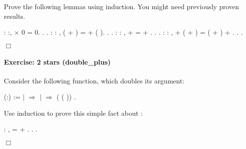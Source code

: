 \documentclass[12pt]{report}
\begin{document}
 Prove the following lemmas using induction. You might need
    previously proven results. \begin{coqdoccode}
\coqdocemptyline
\coqdocnoindent
{}  : \coqdockw{\ensuremath{\forall}} :,\coqdoceol
\coqdocindent{1.00em}
 \ensuremath{\times} 0 = 0.\coqdoceol
\coqdocnoindent
{}.\coqdoceol
 .\coqdoceol
\coqdocemptyline
\coqdocnoindent
{}  : \coqdockw{\ensuremath{\forall}}   : , \coqdoceol
\coqdocindent{1.00em}
 ( + ) =  + ( ).\coqdoceol
\coqdocnoindent
{}.\coqdoceol
 .\coqdoceol
\coqdocemptyline
\coqdocnoindent
{}  : \coqdockw{\ensuremath{\forall}}   : ,\coqdoceol
\coqdocindent{1.00em}
 +  =  + .\coqdoceol
\coqdocnoindent
{}.\coqdoceol
 .\coqdoceol
\coqdocemptyline
\coqdocnoindent
{}  : \coqdockw{\ensuremath{\forall}}    : ,\coqdoceol
\coqdocindent{1.00em}
 + ( + ) = ( + ) + .\coqdoceol
\coqdocnoindent
{}.\coqdoceol
 .\coqdoceol
\end{coqdoccode}
\ensuremath{\Box} 

\paragraph{Exercise: 2 stars (double\_plus)}



 Consider the following function, which doubles its argument: \begin{coqdoccode}
\coqdocemptyline
\coqdocnoindent
{}  (:) :=\coqdoceol
\coqdocindent{1.00em}
  \coqdoceol
\coqdocindent{1.00em}
\ensuremath{|}  \ensuremath{\Rightarrow} \coqdoceol
\coqdocindent{1.00em}
\ensuremath{|}   \ensuremath{\Rightarrow}  ( ( ))\coqdoceol
\coqdocindent{1.00em}
.\coqdoceol
\coqdocemptyline
\end{coqdoccode}
Use induction to prove this simple fact about : \begin{coqdoccode}
\coqdocemptyline
\coqdocnoindent
{}  : \coqdockw{\ensuremath{\forall}} ,   =  +  .\coqdoceol
\coqdocnoindent
{}.\coqdoceol
 .\coqdoceol
\end{coqdoccode}
\ensuremath{\Box} 
\end{document}
